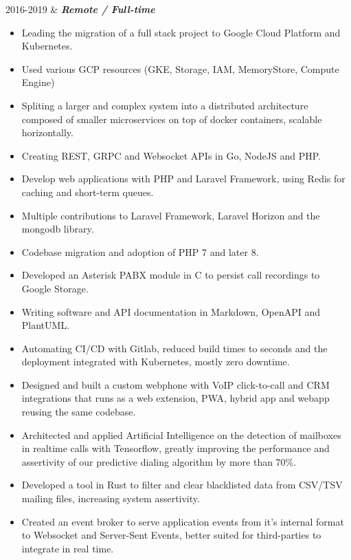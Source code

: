 \documentclass[]{cv-mauri}
\begin{document}
\begin{tabularcv}
    2016-2019   &   
		    		\textbf{\textit{Remote / Full-time}}
		    \begin{itemize}
		    	\item Leading the migration of a full stack project to Google Cloud Platform and Kubernetes.
		    	\item Used various GCP resources (GKE, Storage, IAM, MemoryStore, Compute Engine)
		    	\item Spliting a larger and complex system into a distributed architecture composed of smaller microservices on top of docker containers, scalable horizontally.
		    	\item Creating REST, GRPC and Websocket APIs in Go, NodeJS and PHP.
		    	\item Develop web applications with PHP and Laravel Framework, using Redis for caching and short-term queues.
		    	\item Multiple contributions to Laravel Framework, Laravel Horizon and the mongodb library.
		    	\item Codebase migration and adoption of PHP 7 and later 8.
		    	\item Developed an Asterisk PABX module in C to persist call recordings to Google Storage.
		    	\item Writing software and API documentation in Markdown, OpenAPI and PlantUML.
		    	\item Automating CI/CD with Gitlab, reduced build times to seconds and the deployment integrated with Kubernetes, mostly zero downtime.
		    	\item Designed and built a custom webphone with VoIP click-to-call and CRM integrations that runs as a web extension, PWA, hybrid app and webapp reusing the same codebase.
		    	\item Architected and applied Artificial Intelligence on the detection of mailboxes in realtime calls with Tensorflow, greatly improving the performance and assertivity of our predictive dialing algorithm by more than 70\%.
		    	\item Developed a tool in Rust to filter and clear blacklisted data from CSV/TSV mailing files, increasing system assertivity.
		    	\item Created an event broker to serve application events from it's internal format to Websocket and Server-Sent Events, better suited for third-parties to integrate in real time.
			\end{itemize}


\end{tabularcv}
\end{document}
